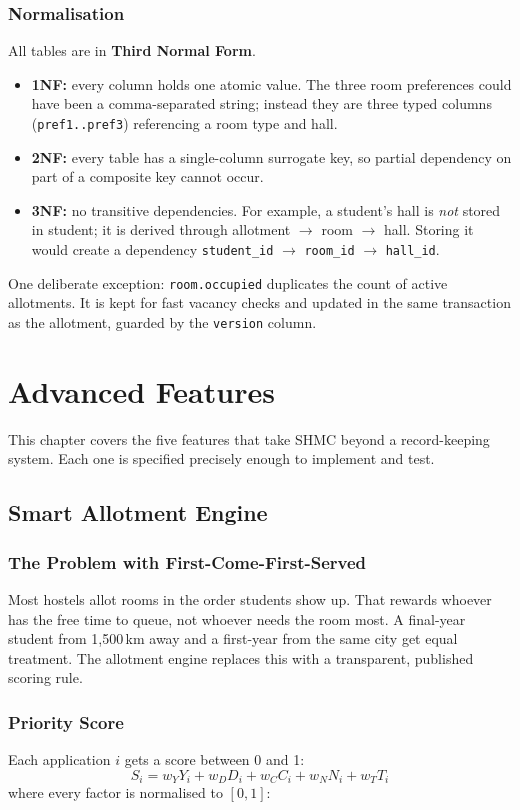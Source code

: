 \documentclass[11pt,a4paper]{report}
\begin{document}
\subsection{Normalisation}
All tables are in \textbf{Third Normal Form}.
\begin{itemize}
  \item \textbf{1NF:} every column holds one atomic value. The three room preferences could have been a comma-separated string; instead they are three typed columns (\texttt{pref1..pref3}) referencing a room type and hall.
  \item \textbf{2NF:} every table has a single-column surrogate key, so partial dependency on part of a composite key cannot occur.
  \item \textbf{3NF:} no transitive dependencies. For example, a student's hall is \emph{not} stored in \textsf{student}; it is derived through \textsf{allotment} $\rightarrow$ \textsf{room} $\rightarrow$ \textsf{hall}. Storing it would create a dependency \texttt{student\_id} $\rightarrow$ \texttt{room\_id} $\rightarrow$ \texttt{hall\_id}.
\end{itemize}
One deliberate exception: \texttt{room.occupied} duplicates the count of active allotments. It is kept for fast vacancy checks and updated in the same transaction as the allotment, guarded by the \texttt{version} column.
\chapter{Advanced Features}
This chapter covers the five features that take SHMC beyond a record-keeping system. Each one is specified precisely enough to implement and test.

\section{Smart Allotment Engine}\label{sec:allot}
\subsection{The Problem with First-Come-First-Served}
Most hostels allot rooms in the order students show up. That rewards whoever has the free time to queue, not whoever needs the room most. A final-year student from 1,500\,km away and a first-year from the same city get equal treatment. The allotment engine replaces this with a transparent, published scoring rule.

\subsection{Priority Score}
Each application $i$ gets a score between 0 and 1:
\begin{equation}
S_i = w_Y Y_i + w_D D_i + w_C C_i + w_N N_i + w_T T_i
\label{eq:score}
\end{equation}
where every factor is normalised to $[0,1]$:
\end{document}
